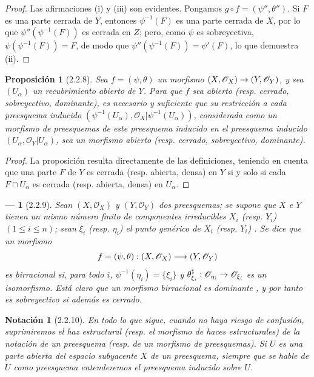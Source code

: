 \documentclass[oneside]{amsart}
\theoremstyle{ega-env-style}
\newtheorem*{env}{---}
\theoremstyle{ega-thm-env-style}
\newtheorem*{proposition}{Proposición}
\theoremstyle{ega-defn-env-style}
\newtheorem*{notation}{Notación}
\def\leq{\leqslant}                 %
\renewcommand{\to}{\mathchoice{\longrightarrow}{\rightarrow}{\rightarrow}{\rightarrow}}
\let\EGAOriginalLabel\label
\renewcommand{\label}[1]{\phantomsection\EGAOriginalLabel{#1}}
\begin{document}
\begin{proof}
Las afirmaciones (i) y (iii) son evidentes.
Pongamos $g\circ f=(\psi'',\theta'')$.
Si $F$ es una parte cerrada de $Y$, entonces $\psi^{-1}(F)$ es una parte cerrada de $X$, por lo que $\psi''(\psi^{-1}(F))$ es cerrada en $Z$;
pero, como $\psi$ es sobreyectiva, $\psi(\psi^{-1}(F))=F$, de modo que $\psi''(\psi^{-1}(F))=\psi'(F)$, lo que demuestra (ii).
\end{proof}

\begin{proposition}[2.2.8]
\label{I.2.2.8}
Sea $f=(\psi,\theta)$ un morfismo $(X,\mathscr{O}_X)\to(Y,\mathscr{O}_Y)$, y sea $(U_\alpha)$ un recubrimiento abierto de $Y$.
Para que $f$ sea abierto \textup{(resp.} cerrado, sobreyectivo, dominante), es necesario y suficiente que su restricción a cada preesquema inducido $(\psi^{-1}(U_\alpha),\mathscr{O}_X|\psi^{-1}(U_\alpha))$, considerada como un morfismo de preesquemas de este preesquema inducido en el preesquema inducido $(U_\alpha,\mathscr{O}_Y|U_\alpha)$, sea un morfismo abierto \textup{(resp.} cerrado, sobreyectivo, dominante).
\end{proposition}

\begin{proof}
La proposición resulta directamente de las definiciones, teniendo en cuenta que una parte $F$ de $Y$ es cerrada (resp. abierta, densa) en $Y$ si y solo si cada $F\cap U_\alpha$ es cerrada (resp. abierta, densa) en $U_\alpha$.
\end{proof}

\begin{env}[2.2.9]
\label{I.2.2.9}
Sean $(X,\mathscr{O}_X)$ y $(Y,\mathscr{O}_Y)$ dos preesquemas;
se supone que $X$ e $Y$ tienen un mismo número \emph{finito} de componentes irreducibles $X_i$ (resp. $Y_i$) $(1\leq i\leq n)$;
sean $\xi_i$ (resp. $\eta_i$) el punto genérico de $X_i$ (resp. $Y_i$) .
Se dice que un morfismo
\[
  f=(\psi,\theta):(X,\mathscr{O}_X)\to(Y,\mathscr{O}_Y)
\]
es \emph{birracional} si, para todo $i$, $\psi^{-1}(\eta_i)=\{\xi_i\}$ y $\theta_{\xi_i}^{\sharp}:\mathscr{O}_{\eta_i}\to\mathscr{O}_{\xi_i}$ es un \emph{isomorfismo}.
Está claro que un morfismo birracional es dominante , y por tanto es sobreyectivo si además es cerrado.
\end{env}

\begin{notation}[2.2.10]
\label{I.2.2.10}
En todo lo que sigue, cuando no haya riesgo de confusión, \emph{suprimiremos} el haz estructural (resp. el morfismo de haces estructurales) de la notación de un preesquema (resp. de un morfismo de preesquemas).
Si $U$ es una parte abierta del espacio subyacente $X$ de un preesquema, siempre que se hable de $U$ como preesquema entenderemos el preesquema inducido sobre $U$.
\end{notation}
\end{document}
